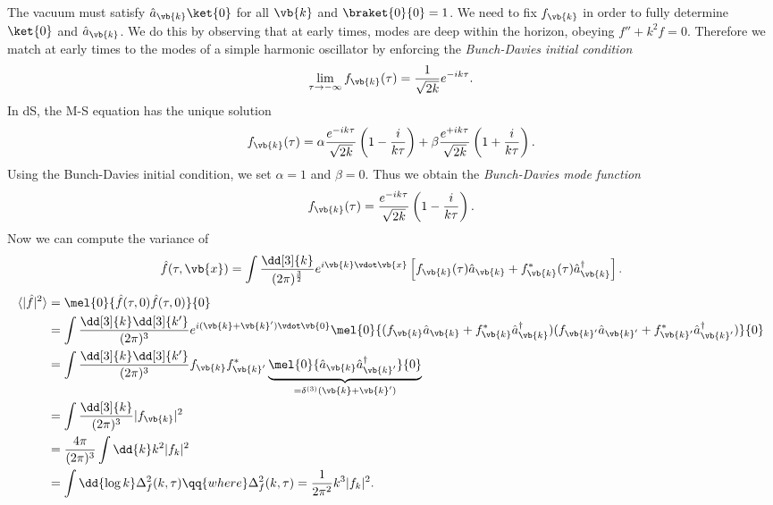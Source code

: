 \documentclass{jknotes}
\begin{document}
The vacuum must satisfy \(\hat{a}_{\vb{k}}\ket{0}\) for all \(\vb{k}\) and \(\braket{0}{0}=1\). We need to fix \(f_{\vb{k}}\) in order to fully determine \(\ket{0}\) and \(\hat{a}_{\vb{k}}\). We do this by observing that at early times, modes are deep within the horizon, obeying \(f'' +k^2f=0\). Therefore we match at early times to the modes of a simple harmonic oscillator by enforcing the \emph{Bunch-Davies initial condition}
\begin{equation}
    \lim_{\tau\to-\infty}f_{\vb{k}}(\tau) = \frac1{\sqrt{2k}}e^{-ik\tau}.
\end{equation}
In dS, the M-S equation has the unique solution
\begin{equation}
    f_{\vb{k}}(\tau) = \alpha\frac{e^{-ik\tau}}{\sqrt{2k}}\left(1-\frac{i}{k\tau}\right) + \beta\frac{e^{+ik\tau}}{\sqrt{2k}}\left(1+\frac{i}{k\tau}\right).
\end{equation}
Using the Bunch-Davies initial condition, we set \(\alpha=1\) and \(\beta=0\). Thus we obtain the \emph{Bunch-Davies mode function}
\begin{equation}
    f_{\vb{k}}(\tau) = \frac{e^{-ik\tau}}{\sqrt{2k}}\left(1-\frac{i}{k\tau}\right).
\end{equation}
Now we can compute the variance of 
\begin{equation}
    \hat{f}(\tau,\vb{x}) = \int\frac{\dd[3]{k}}{(2\pi)^{\frac32}}e^{i\vb{k}\vdot\vb{x}}\left[f_{\vb{k}}(\tau)\hat{a}_{\vb{k}} + f^*_{\vb{k}}(\tau)\hat{a}^\dagger_{\vb{k}}\right].
\end{equation}
\begin{align}
    \langle|\hat{f}|^2\rangle &= \mel{0}{\hat{f}(\tau,0)\hat{f}(\tau,0)}{0} \\
                              &= \int\frac{\dd[3]{k}\dd[3]{k'}}{(2\pi)^3}e^{i(\vb{k}+\vb{k}')\vdot\vb{0}} \mel{0}{(f_{\vb{k}}\hat{a}_{\vb{k}} + f^*_{\vb{k}}\hat{a}^\dagger_{\vb{k}})(f_{\vb{k}'}\hat{a}_{\vb{k}'} + f^*_{\vb{k}'}\hat{a}^\dagger_{\vb{k}'})}{0} \\
                              &= \int\frac{\dd[3]{k}\dd[3]{k'}}{(2\pi)^3}f_{\vb{k}}f_{\vb{k}'}^*\underbrace{\mel{0}{\hat{a}_{\vb{k}}\hat{a}^\dagger_{\vb{k}'}}{0}}_{=\delta^{(3)}(\vb{k}+\vb{k}')} \\
                              &= \int\frac{\dd[3]{k}}{(2\pi)^3} |f_{\vb{k}}|^2 \\
                              &= \frac{4\pi}{(2\pi)^3}\int\dd{k}k^2|f_k|^2 \\
                              &= \int\dd{\log k}\Delta^2_f(k,\tau) \qq{where} \Delta^2_f(k,\tau) = \frac1{2\pi^2}k^3|f_k|^2.
\end{align}
\end{document}
